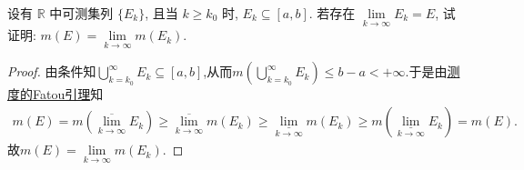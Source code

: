 \documentclass[../../main.tex]{subfiles}%
\begin{document}
\begin{example}
设有 $\mathbb{R}$ 中可测集列 $\{E_k\}$, 且当 $k\geqslant k_0$ 时, $E_k\subseteq[a,b]$. 若存在 $\lim\limits_{k\to\infty}E_k=E$, 试证明: $m(E)=\lim\limits_{k\to\infty}m(E_k)$.
\end{example}
\begin{proof}

由条件知$\bigcup\limits_{k=k_0}^{\infty}E_k\subseteq \left[ a,b \right]$,从而$m\left( \bigcup\limits_{k=k_0}^{\infty}E_k \right) \leqslant b-a<+\infty$.于是由\hyperref[theorem:测度的Fatou引理]{测度的Fatou引理}知
\begin{align*}
m\left( E \right) =m\left( \underset{k\rightarrow \infty}{\overline{\lim }}E_k \right) \geqslant \underset{k\rightarrow \infty}{\overline{\lim }}m\left( E_k \right) \geqslant \underset{k\rightarrow \infty}{\underline{\lim }}m\left( E_k \right) \geqslant m\left( \underset{k\rightarrow \infty}{\underline{\lim }}E_k \right) =m\left( E \right) .
\end{align*}
故$m\left( E \right) =\lim\limits_{k\rightarrow \infty}m\left( E_k \right).$

\end{proof}
\end{document}
